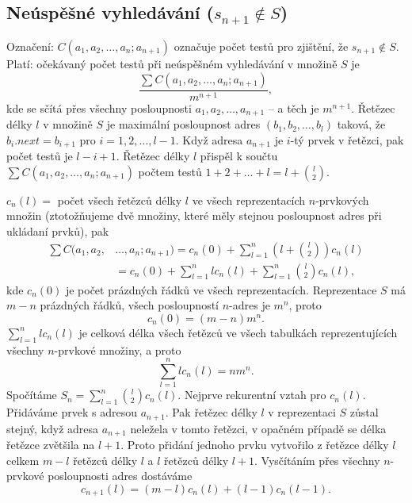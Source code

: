 \documentclass[a4paper,12pt]{article}
\begin{document}
\subsection{
Neúspěšné vyhledávání ($s_{n+1}\notin S$) 
}

Označení: $C(a_1,a_2,\dots,a_n;a_{n+1})$ označuje počet 
testů pro zjiš\-tění, že $s_{n+1}\notin S$. Platí: 
očekávaný počet testů při 
neúspěšném vy\-hledávání v množině $S$ je 
$$\frac {\sum C(a_1,a_2,\dots,a_n;a_{n+1})}{m^{n+1}},$$
kde se sčítá přes všechny posloupnosti $a_1,a_2,\dots
,a_{n+1}$ -- 
a těch je $m^{n+1}$. \newline 
Řetězec délky $l$ v množině $S$ je maximální posloupnost 
adres $(b_1,b_2,\dots,b_l)$ taková, že $b_i.next=b_{i+1}$ pro 
$i=1,2,\dots,l-1$.
Když adresa $a_{n+1}$ je $i$-tý prvek v řetězci, pak počet 
testů je $l-i+1$. Řetězec délky $l$ přispěl k součtu 
$\sum C(a_1,a_2,\dots,a_n;a_{n+1})$ počtem testů $1+2+\dots+l=l+\binom l2$. 

$c_n(l)=$ počet všech řetězců délky $
l$ ve všech 
reprezentacích $n$-prvkových množin (ztotožňuje\-me dvě 
množiny, které měly stej\-nou posloupnost adres při 
ukládaní prvků), pak 
\begin{align*}\sum C(a_1,a_2,&\dots,a_n;a_{n+1})=c_n(0)+\sum_{l=1}^n(l+\binom 
l2)c_n(l)\\
&=c_n(0)+\sum_{l=1}^nlc_n(l)+\sum_{l=1}^n\binom l2c_n(l),\end{align*}
kde $c_n(0)$ je počet prázdných řádků ve všech 
reprezentacích. \newline 
Reprezentace $S$ má $m-n$ prázdných řádků,\newline 
všech posloupností $n$-adres je $m^n$, proto 
$$c_n(0)=(m-n)m^n.$$
$\sum_{l=1}^nlc_n(l)$ je celková délka všech řetězců ve 
všech tabulkách reprezentujících všechny $n$-prvkové 
množiny, a proto 
$$\sum_{l=1}^nlc_n(l)=nm^n.$$
Spočítáme $S_n=\sum_{l=1}^n\binom l2c_n(l)$.  Nejprve rekurentní vztah 
pro $c_n(l)$.  Přidáváme prvek s adresou $a_{n+1}$.  Pak řetězec 
délky $l$ v reprezentaci $S$ zůstal stejný, když 
adresa $a_{n+1}$ neležela v tomto řetězci, v opačném případě 
se délka řetězce zvětšila na $l+1$.  Proto přidání jednoho 
prvku vytvořilo z řetězce délky $l$ celkem $m-l$ 
řetězců délky $l$ a $l$ řetězců délky $
l+1$.  
Vysčítáním přes všechny $n$-prvkové posloupnosti adres 
dostáváme 
$$c_{n+1}(l)=(m-l)c_n(l)+(l-1)c_n(l-1).$$
\end{document}
